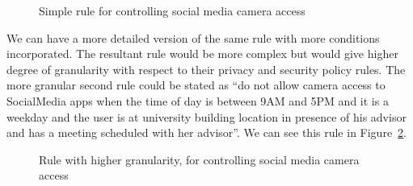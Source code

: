 \begin{figure}[tb]
	\centering
	\noindent{}
	\caption{Simple rule for controlling social media camera access}
	\label{ruleSimple}
\end{figure}

We can have a more detailed version of the same rule with more conditions incorporated. The resultant rule would be more complex but would give higher degree of granularity with respect to their privacy and security policy rules. The more granular second rule could be stated as ``do not allow camera access to SocialMedia apps when the time of day is between 9AM and 5PM and it is a weekday and the user is at university building location in presence of his advisor and has a meeting scheduled with her advisor''. We can see this rule in Figure~\ref{ruleLong}.
\begin{figure}[tb]
	\centering
	\noindent{}
	\caption{Rule with higher granularity, for controlling social media camera access}
	\label{ruleLong}
\end{figure}